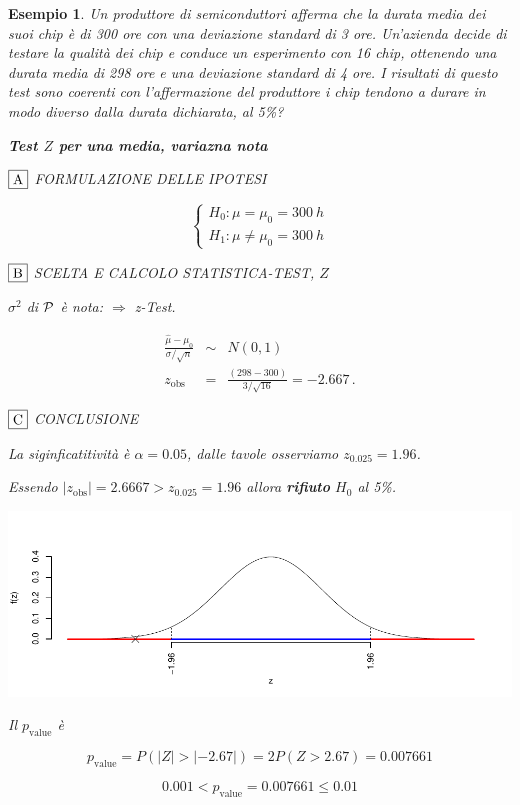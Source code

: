 \documentclass[
  11pt,
]{book}
\theoremstyle{mytheoremstyle}
\theoremstyle{mydefstyle}
\newtheorem{example}{{Esempio}}[section]
\begin{document}
\begin{example}
Un produttore di semiconduttori afferma che la durata media dei suoi chip è di 300 ore con una deviazione standard di 3 ore. Un'azienda decide di testare la qualità dei chip e conduce un esperimento con 16 chip, ottenendo una durata media di 298 ore e una deviazione standard di 4 ore. I risultati di questo test sono coerenti con l'affermazione del produttore i chip tendono a durare in modo diverso dalla durata dichiarata, al 5\%?

\textbf{Test \(Z\) per una media, variazna nota}

\(\fbox{A}\) FORMULAZIONE DELLE IPOTESI

\[\begin{cases}
   H_0: \mu = \mu_0=300~h \\
   H_1: \mu \neq \mu_0=300~h 
   \end{cases}\]

\(\fbox{B}\) SCELTA E CALCOLO STATISTICA-TEST, \(Z\)

\(\sigma^{2}\) di \(\cal{P}\) è nota: \(\Rightarrow\) z-Test.

\begin{eqnarray*}
   \frac{\hat\mu - \mu_{0}} {\sigma/\sqrt{n}}&\sim&N(0,1)\\
   z_{\text{obs}}
   &=& \frac{ ( 298 -  300 )} { 3 /\sqrt{ 16 }}
   =   -2.667 \, .
   \end{eqnarray*}

\(\fbox{C}\) CONCLUSIONE

La siginficatitività è \(\alpha=0.05\), dalle tavole osserviamo \(z_{0.025}=1.96\).

Essendo \(|z_\text{obs}|=2.6667>z_{0.025}=1.96\) allora \textbf{rifiuto} \(H_0\) al 5\%.

\begin{center}\includegraphics{Appunti_di_Statistica_2025_files/figure-latex/15-test-mu-pi-4,-1} \end{center}

Il \(p_{\text{value}}\) è

\[ p_{\text{value}} = P(|Z|>|-2.67|)=2P(Z>2.67)=0.007661 \]

\[
 0.001 < p_\text{value}= 0.007661 \leq 0.01 
\]
\end{example}
\end{document}
